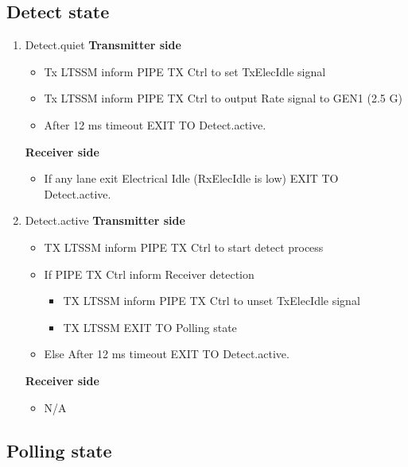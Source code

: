\subsection{Detect state}
\begin{enumerate}
  \item Detect.quiet 
 \newline \textbf{Transmitter side}
  \begin{itemize}
    \item Tx LTSSM inform PIPE TX Ctrl to set TxElecIdle signal 
    \item Tx LTSSM inform PIPE TX Ctrl to output Rate signal to GEN1 (2.5 G) 
    \item After 12 ms timeout EXIT TO Detect.active.
  \end{itemize}
    \textbf{Receiver side}
\begin{itemize}
  
  \item If any lane exit Electrical Idle
   (RxElecIdle is low) EXIT TO Detect.active.
\end{itemize}
  \item Detect.active
 \textbf{Transmitter side}  
 \begin{itemize}
   \item  TX LTSSM inform PIPE TX Ctrl to start detect process
  \item   If  PIPE TX Ctrl inform Receiver detection 
\begin{itemize}
  \item TX LTSSM inform PIPE TX Ctrl to unset TxElecIdle signal 
  \item TX LTSSM EXIT TO Polling state
\end{itemize}
\item Else After 12 ms timeout EXIT TO Detect.active.

 \end{itemize}
        
\textbf{Receiver side}  
\begin{itemize}
  \item N/A
\end{itemize}    

\end{enumerate}
\subsection{Polling state}

